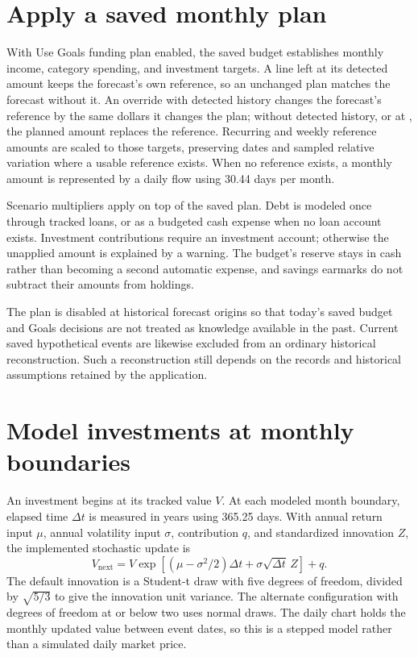 \section{Apply a saved monthly plan}
With Use Goals funding plan enabled, the saved budget establishes monthly income, category spending, and investment targets. A line left at its detected amount keeps the forecast's own reference, so an unchanged plan matches the forecast without it. An override with detected history changes the forecast's reference by the same dollars it changes the plan; without detected history, or at , the planned amount replaces the reference. Recurring and weekly reference amounts are scaled to those targets, preserving dates and sampled relative variation where a usable reference exists. When no reference exists, a monthly amount is represented by a daily flow using 30.44 days per month.

Scenario multipliers apply on top of the saved plan. Debt is modeled once through tracked loans, or as a budgeted cash expense when no loan account exists. Investment contributions require an investment account; otherwise the unapplied amount is explained by a warning. The budget's reserve stays in cash rather than becoming a second automatic expense, and savings earmarks do not subtract their amounts from holdings.

The plan is disabled at historical forecast origins so that today's saved budget and Goals decisions are not treated as knowledge available in the past. Current saved hypothetical events are likewise excluded from an ordinary historical reconstruction. Such a reconstruction still depends on the records and historical assumptions retained by the application.

\section{Model investments at monthly boundaries}
An investment begins at its tracked value \(V\). At each modeled month boundary, elapsed time \(\Delta t\) is measured in years using 365.25 days. With annual return input \(\mu\), annual volatility input \(\sigma\), contribution \(q\), and standardized innovation \(Z\), the implemented stochastic update is
\begin{equation}\label{eq:investment}
 V_{\mathrm{next}}=V\exp\left[(\mu-\sigma^2/2)\Delta t+
 \sigma\sqrt{\Delta t}\,Z\right]+q.
\end{equation}
The default innovation is a Student-t draw with five degrees of freedom, divided by \(\sqrt{5/3}\) to give the innovation unit variance. The alternate configuration with degrees of freedom at or below two uses normal draws. The daily chart holds the monthly updated value between event dates, so this is a stepped model rather than a simulated daily market price.

